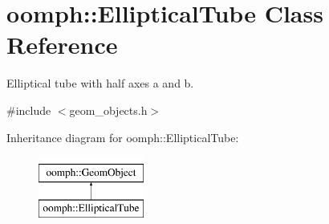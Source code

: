 \hypertarget{classoomph_1_1EllipticalTube}{}\section{oomph\+:\+:Elliptical\+Tube Class Reference}
\label{classoomph_1_1EllipticalTube}


Elliptical tube with half axes a and b.  




{\ttfamily \#include $<$geom\+\_\+objects.\+h$>$}

Inheritance diagram for oomph\+:\+:Elliptical\+Tube\+:\begin{figure}[H]
\begin{center}
\leavevmode
\includegraphics[height=2.000000cm]{classoomph_1_1EllipticalTube}
\end{center}
\end{figure}
